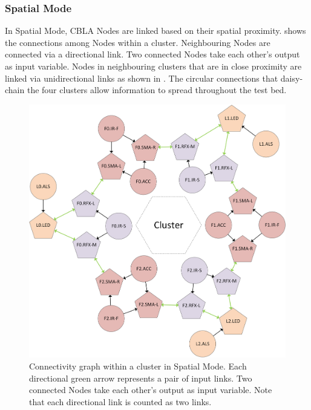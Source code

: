 \subsubsection{Spatial Mode}

In Spatial Mode, CBLA Nodes are linked based on their spatial proximity.  shows the connections among Nodes within a cluster. Neighbouring Nodes are connected via a directional link. Two connected Nodes take each other's output as input variable. Nodes in neighbouring clusters that are in close proximity are linked via unidirectional links as shown in . The circular connections that daisy-chain the four clusters allow information to spread throughout the test bed. 

\begin{figure} [!htbp]
	\centering
	\includegraphics[width=1.0\textwidth]{"fig/validations/Spatial Local Mode"}
	\caption[Connectivity graph within a cluster in Spatial Mode]{Connectivity graph within a cluster in Spatial Mode. Each directional green arrow represents a pair of input links. Two connected Nodes take each other's output as input variable. Note that each directional link is counted as two links.}
	\label{fig:Spatial Local Modes}
\end{figure}

